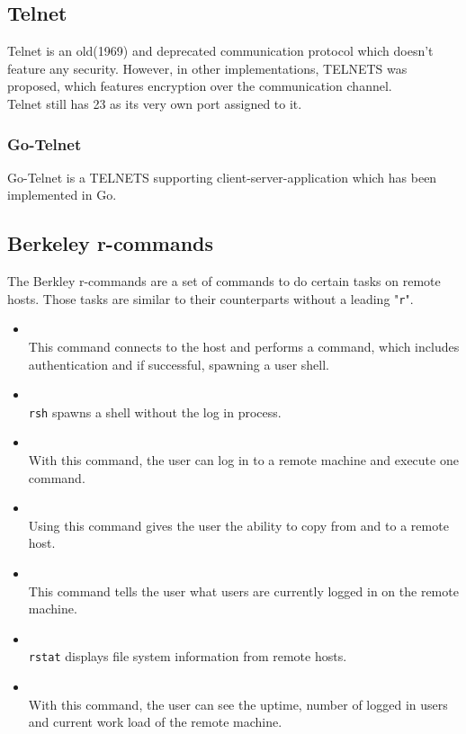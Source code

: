 \documentclass[10pt,a4paper,titlepage,twoside,english,final]{zhawreprt}
\begin{document}
\subsection{Telnet}\label{ssec:Telnet}
Telnet\citep{rfc15,rfc854} is an old(1969) and deprecated communication protocol which doesn't feature any security. However, in other implementations, \gls{TELNETS} was proposed, which features encryption over the communication channel.\\
Telnet still has 23 as its very own \gls{port} assigned to it.
\subsubsection{Go-Telnet}
Go-Telnet\citep{gotelnet} is a \gls{TELNETS} supporting client-server-application which has been implemented in \gls{Go}.

\subsection{Berkeley r-commands}\label{ssec:BerkeleyRCommands}
The Berkley r-commands are a set of commands to do certain tasks on remote hosts. Those tasks are similar to their counterparts without a leading "\texttt{r}".
\begin{itemize}
\item \cite{rlogin}\\
This command connects to the host and performs a \cite{login} command, which includes authentication and if successful, spawning a user \gls{shell}.
\item \cite{rsh}\\
\texttt{rsh} spawns a \gls{shell} without the log in process.
\item \cite{rexec}\\
With this command, the user can log in to a remote machine and execute one command.
\item \cite{rcp}\\
Using this command gives the user the ability to copy from and to a remote host.
\item \cite{rwho}\\
This command tells the user what users are currently logged in on the remote machine.
\item \cite{rstat}\\
\texttt{rstat} displays file system information from remote hosts.
\item \cite{ruptime}\\
With this command, the user can see the uptime, number of logged in users and current work load of the remote machine.
\end{itemize}
\end{document}
